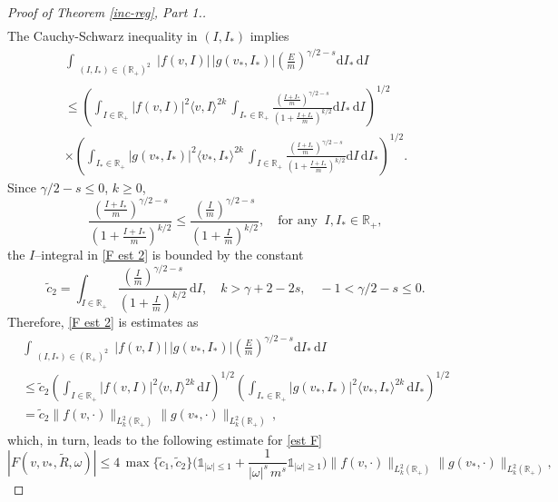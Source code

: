 \documentclass[11pt,a4paper]{amsart}
\newcommand{\bRp}{\mathbb{R}_+}
\newcommand{\md}{\mathrm{d}}
\newcommand{\g}{\gamma}
\newcommand{\la}{\langle}
\newcommand{\ra}{\rangle}
\newcommand{\E}{\left(\frac{E}{m}\right)}
\newcommand{\ien}{\int_{\substack{(I,I_*)\in (\bRp)^2 }}}
\newcommand{\cI}{\tilde{c}_1}
\newcommand{\cIIs}{\tilde{c}_2}
\begin{document}
\begin{proof}[Proof of Theorem \ref{inc-reg}, Part 1.]
\begin{multline*}
\end{multline*}
The Cauchy-Schwarz inequality in $(I,I_*)$ implies
\begin{multline}\label{F est 2}
 \ien  |f(v,I)| \, |g(v_*,I_*)|  \E^{\g/2-s} \md I_* \, \md I    
\\
\leq    \left( \int_{I\in \bRp} |f(v,I)|^2   \la v, I \ra^{2k} \, \int_{I_*\in \bRp}   \frac{\left(\frac{ I +I_*}{m}\right)^{\g/2-s}}{\left(1+\tfrac{I+I_*}{m}\right)^{k/2}}  \md I_* \, \md I \right)^{1/2} 
\\ \times \left( \int_{I_*\in \bRp} |g(v_*,I_*)|^2   \la v_*, I_* \ra^{2k} \, \int_{I\in \bRp}   \frac{\left(\frac{ I +I_*}{m}\right)^{\g/2-s}}{\left(1+\tfrac{I+I_*}{m}\right)^{k/2}}  \md I \,   \md I_*  \right)^{1/2}.
\end{multline}
Since $\g/2-s\leq 0$, $k\geq 0$,
\begin{equation*}
\frac{\left(\frac{ I +I_*}{m}\right)^{\g/2-s}}{\left(1+\tfrac{I+I_*}{m}\right)^{k/2}}  \leq \frac{\left(\frac{ I }{m}\right)^{\g/2-s}}{\left(1+\tfrac{I}{m}\right)^{k/2}}, \quad \text{for any } \ I, I_* \in \bRp,
\end{equation*}
the $I$--integral in \eqref{F est 2} is bounded by the constant 
\begin{equation}\label{c2 tilde}
\cIIs =  \int_{I\in \bRp}   \frac{\left(\frac{ I}{m}\right)^{\g/2-s}}{\left(1+\tfrac{I}{m}\right)^{k/2}} \,   \md I, \quad k>\gamma+2-2s, \quad -1 < \g/2 - s \leq 0.
\end{equation}
Therefore, \eqref{F est 2} is estimates as
\begin{multline}\label{F est 3}
	\ien  |f(v,I)| \, |g(v_*,I_*)|  \E^{\g/2-s} \md I_* \, \md I    
	\\
	\leq  \cIIs  \left( \int_{I\in \bRp} |f(v,I)|^2   \la v, I \ra^{2k} \, \md I \right)^{1/2} 
\left( \int_{I_*\in \bRp} |g(v_*,I_*)|^2   \la v_*, I_* \ra^{2k}  \,   \md I_*  \right)^{1/2}
\\
=  \cIIs  \| f(v,\cdot)\|_{L^2_{k}(\bRp)}  \| g(v_*,\cdot)\|_{L^2_{k}(\bRp)}\,,
\end{multline}
which, in turn, leads to the following estimate for \eqref{est F} 
\begin{equation*}
	\left| 	F(v,v_*,\tilde{R},\omega)  \right| \leq 4 \,   \max\{\cI,  \cIIs\} 
	\Bigg( \mathds{1}_{|\omega| \leq 1} 
	+ \frac{1}{|\omega|^s  \, m^s} \mathds{1}_{|\omega| \geq 1} \Bigg)  \| f(v,\cdot)\|_{L^2_{k}(\bRp)}  \| g(v_*,\cdot)\|_{L^2_{k}(\bRp)},

\end{equation*}
\end{proof}
\end{document}
